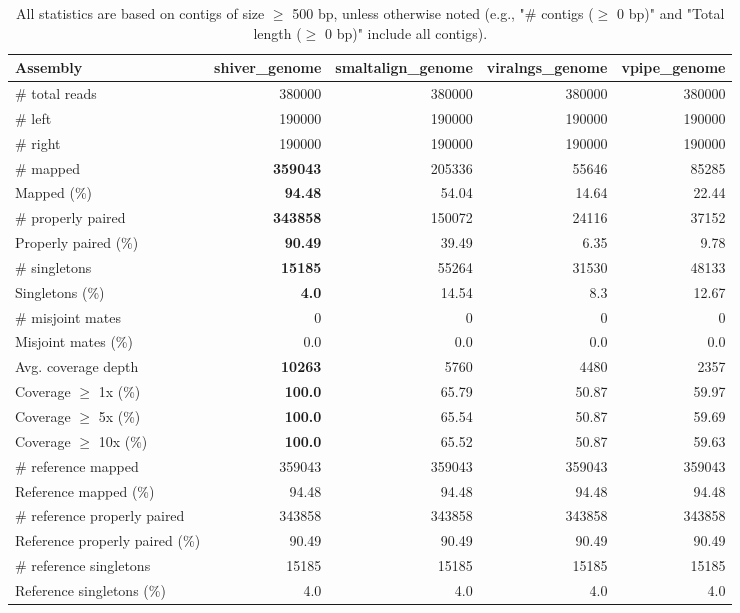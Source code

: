 \documentclass[12pt,a4paper]{article}
\begin{document}
\begin{table}[ht]
\begin{center}
\caption{All statistics are based on contigs of size $\geq$ 500 bp, unless otherwise noted (e.g., "\# contigs ($\geq$ 0 bp)" and "Total length ($\geq$ 0 bp)" include all contigs).}
\begin{tabular}{|l*{4}{|r}|}
\hline
Assembly & shiver\_genome & smaltalign\_genome & viralngs\_genome & vpipe\_genome \\ \hline
\# total reads & 380000 & 380000 & 380000 & 380000 \\ \hline
\# left & 190000 & 190000 & 190000 & 190000 \\ \hline
\# right & 190000 & 190000 & 190000 & 190000 \\ \hline
\# mapped & {\bf 359043} & 205336 & 55646 & 85285 \\ \hline
Mapped (\%) & {\bf 94.48} & 54.04 & 14.64 & 22.44 \\ \hline
\# properly paired & {\bf 343858} & 150072 & 24116 & 37152 \\ \hline
Properly paired (\%) & {\bf 90.49} & 39.49 & 6.35 & 9.78 \\ \hline
\# singletons & {\bf 15185} & 55264 & 31530 & 48133 \\ \hline
Singletons (\%) & {\bf 4.0} & 14.54 & 8.3 & 12.67 \\ \hline
\# misjoint mates & 0 & 0 & 0 & 0 \\ \hline
Misjoint mates (\%) & 0.0 & 0.0 & 0.0 & 0.0 \\ \hline
Avg. coverage depth & {\bf 10263} & 5760 & 4480 & 2357 \\ \hline
Coverage $\geq$ 1x (\%) & {\bf 100.0} & 65.79 & 50.87 & 59.97 \\ \hline
Coverage $\geq$ 5x (\%) & {\bf 100.0} & 65.54 & 50.87 & 59.69 \\ \hline
Coverage $\geq$ 10x (\%) & {\bf 100.0} & 65.52 & 50.87 & 59.63 \\ \hline
\# reference mapped & 359043 & 359043 & 359043 & 359043 \\ \hline
Reference mapped (\%) & 94.48 & 94.48 & 94.48 & 94.48 \\ \hline
\# reference properly paired & 343858 & 343858 & 343858 & 343858 \\ \hline
Reference properly paired (\%) & 90.49 & 90.49 & 90.49 & 90.49 \\ \hline
\# reference singletons & 15185 & 15185 & 15185 & 15185 \\ \hline
Reference singletons (\%) & 4.0 & 4.0 & 4.0 & 4.0 \\ \hline

\end{tabular}
\end{center}
\end{table}
\end{document}
